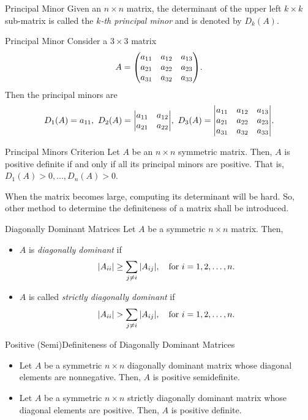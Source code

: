 \begin{df}{Principal Minor}
	Given an $n\times n$ matrix, the determinant of the upper left $k\times k$ sub-matrix is called the \textit{$k$-th principal minor} and is denoted by $D_k(A)$.
\end{df}
\begin{eg}{Principal Minor}
	Consider a $3\times 3$ matrix \[A=\mqty(a_{11}&a_{12}&a_{13}\\a_{21}&a_{22}&a_{23}\\a_{31}&a_{32}&a_{33}).\]	Then the principal minors are \[D_1(A)=a_{11},\ D_2(A)=\mqty|a_{11}&a_{12}\\a_{21}&a_{22}|,\ D_3(A)=\mqty|a_{11}&a_{12}&a_{13}\\a_{21}&a_{22}&a_{23}\\a_{31}&a_{32}&a_{33}|.\]
\end{eg}
\begin{thm}{Principal Minors Criterion}
	Let $A$ be an $n\times n$ symmetric matrix. Then, $A$ is positive definite if and only if all its principal minors are positive. That is, $D_1(A)>0,\dots,D_n(A)>0$.
\end{thm}
\begin{rmk}
	When the matrix becomes large, computing its determinant will be hard. So, other method to determine the definiteness of a matrix shall be introduced. 	
\end{rmk}
\begin{df}{Diagonally Dominant Matrices}
	Let $A$ be a symmetric $n\times n$ matrix. Then, 
	\begin{itemize}
		\item $A$ is \textit{diagonally dominant} if \[\qty|A_{ii}|\geq\sum_{j\neq i}\qty|A_{ij}|,\quad\text{for }i=1,2,\dots,n.\]
		\item $A$ is called \textit{strictly diagonally dominant} if \[\qty|A_{ii}|>\sum_{j\neq i}\qty|A_{ij}|,\quad\text{for }i=1,2,\dots,n.\]
	\end{itemize}	
\end{df}
\begin{thm}{Positive (Semi)Definiteness of Diagonally Dominant Matrices}
	\begin{itemize}
		\item Let $A$ be a symmetric $n\times n$ diagonally dominant matrix whose diagonal elements are nonnegative. Then, $A$ is positive semidefinite.
		\item Let $A$ be a symmetric $n\times n$ strictly diagonally dominant matrix whose diagonal elements are positive. Then, $A$ is positive definite. 
	\end{itemize}	
\end{thm}

